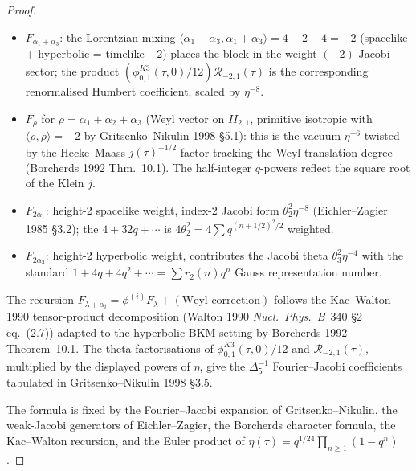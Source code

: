 \begin{proof}
\begin{itemize}
\S 3.5 first-row coefficient of $\phi_1(\tau, 0)$.
\item $F_{\alpha_1 + \alpha_3}$: the Lorentzian mixing
$\langle\alpha_1 + \alpha_3,\alpha_1 + \alpha_3\rangle = 4 - 2 - 4 = -2$
(spacelike + hyperbolic = timelike $-2$) places the block in the
weight-$(-2)$ Jacobi sector; the product
\((\phi_{0,1}^{K3}(\tau,0)/12)\mathcal R_{-2,1}(\tau)\) is the corresponding
renormalised Humbert coefficient, scaled by $\eta^{-8}$.
\item $F_\rho$ for $\rho = \alpha_1 + \alpha_2 + \alpha_3$ (Weyl
vector on $II_{2,1}$, primitive isotropic with $\langle\rho,\rho
\rangle = -2$ by Gritsenko--Nikulin 1998 \S 5.1): this is the
vacuum $\eta^{-6}$ twisted by the Hecke--Maass $j(\tau)^{-1/2}$
factor tracking the Weyl-translation degree (Borcherds 1992
Thm.~10.1). The half-integer $q$-powers reflect the square root of
the Klein $j$.
\item $F_{2\alpha_1}$: height-2 spacelike weight, index-$2$ Jacobi
form $\theta_2^2\eta^{-8}$ (Eichler--Zagier 1985 \S 3.2); the
$4 + 32q + \cdots$ is $4\theta_2^2 = 4\sum q^{(n+1/2)^2/2}$
weighted.
\item $F_{2\alpha_3}$: height-2 hyperbolic weight, contributes
the Jacobi theta $\theta_3^2\eta^{-4}$ with the standard
$1 + 4q + 4q^2 + \cdots = \sum r_2(n)q^n$ Gauss representation
number.
\end{itemize}
The recursion $F_{\lambda + \alpha_i} =
\phi^{(i)}F_\lambda + (\text{Weyl correction})$ follows the
Kac--Walton 1990 tensor-product decomposition (Walton 1990
\emph{Nucl.~Phys.~B}~340 \S 2 eq.~(2.7)) adapted to the
hyperbolic BKM setting by Borcherds 1992 Theorem~10.1.
The theta-factorisations of \(\phi_{0,1}^{K3}(\tau,0)/12\) and
\(\mathcal R_{-2,1}(\tau)\), multiplied by the displayed powers of
\(\eta\), give the \(\Delta_5^{-1}\) Fourier--Jacobi coefficients
tabulated in Gritsenko--Nikulin 1998 \S 3.5.

The formula is fixed by the Fourier--Jacobi expansion of
Gritsenko--Nikulin, the weak-Jacobi generators of Eichler--Zagier, the
Borcherds character formula, the Kac--Walton recursion, and the Euler
product of \(\eta(\tau)=q^{1/24}\prod_{n\geq1}(1-q^n)\).
\end{proof}

